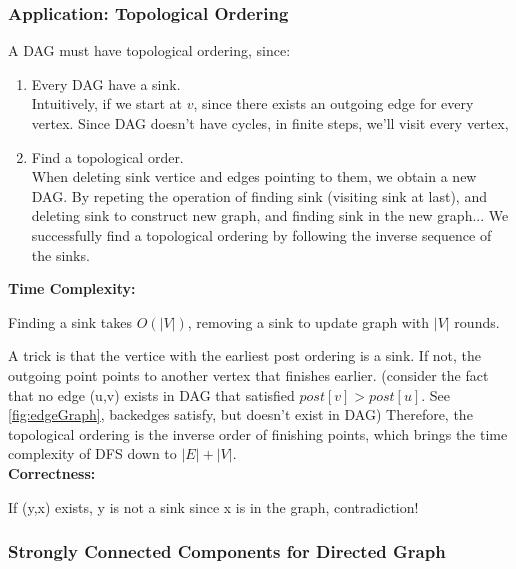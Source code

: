 \subsubsection{Application: Topological Ordering}
A DAG must have topological ordering, since:
\begin{enumerate}
    \item Every DAG have a sink.\\
    Intuitively, if we start at $v$, since there exists an outgoing edge for every vertex. Since DAG doesn't have cycles, in finite steps, we'll visit every vertex,
    \item Find a topological order.\\
    When deleting sink vertice and edges pointing to them, we obtain a new DAG. By repeting the operation of finding sink (visiting sink at last), and deleting sink to construct new graph, and finding sink in the new graph... We successfully find a topological ordering by following the inverse sequence of the sinks.\\
\end{enumerate}
\textbf{Time Complexity:}

Finding a sink takes $O(|V|)$, removing a sink to update graph with $|V|$ rounds.

A trick is that the vertice with the earliest post ordering is a sink. If not, the outgoing point points to another vertex that finishes earlier.
(consider the fact that no edge (u,v) exists in DAG that satisfied $post[v] > post[u]$. See \ref{fig:edgeGraph}, backedges satisfy, but doesn't exist in DAG)
Therefore, the topological ordering is the inverse order of finishing points, which brings the time complexity of DFS down to $|E|+|V|$.\\
\textbf{Correctness:}

If (y,x) exists, y is not a sink since x is in the graph, contradiction!


\subsubsection{Strongly Connected Components for Directed Graph}

